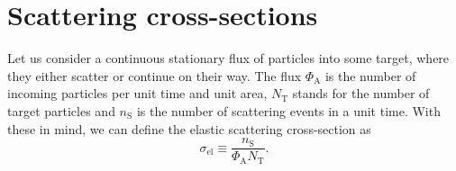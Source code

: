 \documentclass[a4paper, twoside, english, 12pt]{report}
\begin{document}
\clearpage
\section{Scattering cross-sections}\label{SS:cross_sections}

Let us consider a continuous stationary flux of particles into some target, where they either scatter or continue on their way. The flux $\Phi_\text{A}$ is the number of incoming particles per unit time  and unit area, $N_{\text{T}}$ stands for the number of target particles and $n_\text{S}$ is the number of scattering events in a unit time. With these in mind, we can define the elastic scattering cross-section as
\begin{equation}\label{E:cross_sections_definition}
	\sigma_{\text{el}} \equiv \frac{n_\text{S}}{\Phi_\text{A}N_{\text{T}}}.
\end{equation}
\end{document}
